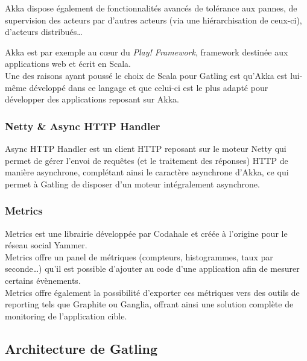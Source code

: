 Akka dispose également de fonctionnalités avancés de tolérance aux pannes, de supervision des acteurs  par d'autres acteurs (via une hiérarchisation de ceux-ci), d'acteurs distribués\ldots

Akka est par exemple au cœur du \textit{Play! Framework}, framework destinée aux applications web et écrit en Scala.\\

Une des raisons ayant poussé le choix de Scala pour Gatling est qu'Akka est lui-même développé dans ce langage et que celui-ci est le plus adapté pour développer des applications reposant sur Akka.
 
\subsubsection{Netty \& Async HTTP Handler}

Async HTTP Handler est un client HTTP reposant sur le moteur Netty qui permet de gérer l'envoi de requêtes (et le traitement des réponses) HTTP de manière asynchrone, complétant ainsi le caractère asynchrone d'Akka, ce qui permet à Gatling de disposer d'un moteur intégralement asynchrone.

\subsubsection{Metrics}

Metrics est une librairie développée par Codahale et créée à l'origine pour le réseau social Yammer.\\

Metrics offre un panel de métriques (compteurs, histogrammes, taux par seconde\ldots) qu'il est possible d'ajouter au code d'une application afin de mesurer certains évènements.\\
Metrics offre également la possibilité d'exporter ces métriques vers des outils de reporting tels que Graphite ou Ganglia, offrant ainsi une solution complète de monitoring de l'application cible.
\subsection{Architecture de Gatling}

